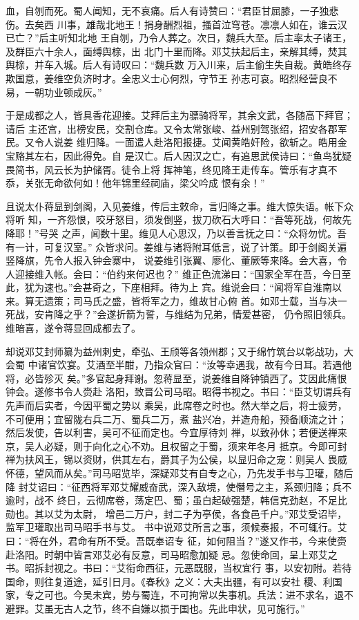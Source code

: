 血，自刎而死。蜀人闻知，无不哀痛。后人有诗赞曰：“君臣甘屈膝，一子独悲伤。去矣西
川事，雄哉北地王！捐身酬烈祖，搔首泣穹苍。凛凛人如在，谁云汉已亡？”后主听知北地
王自刎，乃令人葬之。次日，魏兵大至。后主率太子诸王，及群臣六十余人，面缚舆榇，出
北门十里而降。邓艾扶起后主，亲解其缚，焚其舆榇，并车入城。后人有诗叹曰：“魏兵数
万入川来，后主偷生失自裁。黄皓终存欺国意，姜维空负济时才。全忠义士心何烈，守节王
孙志可哀。昭烈经营良不易，一朝功业顿成灰。”

于是成都之人，皆具香花迎接。艾拜后主为骠骑将军，其余文武，各随高下拜官；请后
主还宫，出榜安民，交割仓库。又令太常张峻、益州别驾张绍，招安各郡军民。又令人说姜
维归降。一面遣人赴洛阳报捷。艾闻黄皓奸险，欲斩之。皓用金宝赂其左右，因此得免。自
是汉亡。后人因汉之亡，有追思武侯诗曰：“鱼鸟犹疑畏简书，风云长为护储胥。徒令上将
挥神笔，终见降王走传车。管乐有才真不忝，关张无命欲何如！他年锦里经祠庙，梁父吟成
恨有余！”

且说太仆蒋显到剑阁，入见姜维，传后主敕命，言归降之事。维大惊失语。帐下众将听
知，一齐怨恨，咬牙怒目，须发倒竖，拔刀砍石大呼曰：“吾等死战，何故先降耶！”号哭
之声，闻数十里。维见人心思汉，乃以善言抚之曰：“众将勿忧。吾有一计，可复汉室。”
众皆求问。姜维与诸将附耳低言，说了计策。即于剑阁关遍竖降旗，先令人报入钟会寨中，
说姜维引张翼、廖化、董厥等来降。会大喜，令人迎接维入帐。会曰：“伯约来何迟也？”
维正色流涕曰：“国家全军在吾，今日至此，犹为速也。”会甚奇之，下座相拜。待为上
宾。维说会曰：“闻将军自淮南以来。算无遗策；司马氏之盛，皆将军之力，维故甘心俯
首。如邓士载，当与决一死战，安肯降之乎？”会遂折箭为誓，与维结为兄弟，情爱甚密，
仍令照旧领兵。维暗喜，遂令蒋显回成都去了。

却说邓艾封师纂为益州刺史，牵弘、王颀等各领州郡；又于绵竹筑台以彰战功，大会蜀
中诸官饮宴。艾酒至半酣，乃指众官曰：“汝等幸遇我，故有今日耳。若遇他将，必皆殄灭
矣。”多官起身拜谢。忽蒋显至，说姜维自降钟镇西了。艾因此痛恨钟会。遂修书令人赍赴
洛阳，致晋公司马昭。昭得书视之。书曰：“臣艾切谓兵有先声而后实者，今因平蜀之势以
乘吴，此席卷之时也。然大举之后，将士疲劳，不可便用；宜留陇右兵二万、蜀兵二万，煮
盐兴冶，并造舟船，预备顺流之计；然后发使，告以利害，吴可不征而定也。今宜厚待刘
禅，以致孙休；若便送禅来京，吴人必疑，则于向化之心不劝。且权留之于蜀，须来年冬月
抵京。今即可封禅为扶风王，锡以资财，供其左右，爵其子为公侯，以显归命之宠：则吴人
畏威怀德，望风而从矣。”司马昭览毕，深疑邓艾有自专之心，乃先发手书与卫瓘，随后降
封艾诏曰：“征西将军邓艾耀威奋武，深入敌境，使僭号之主，系颈归降；兵不逾时，战不
终日，云彻席卷，荡定巴、蜀；虽白起破强楚，韩信克劲赵，不足比勋也。其以艾为太尉，
增邑二万户，封二子为亭侯，各食邑千户。”邓艾受诏毕，监军卫瓘取出司马昭手书与艾。
书中说邓艾所言之事，须候奏报，不可辄行。艾曰：“将在外，君命有所不受。吾既奉诏专
征，如何阻当？”遂又作书，今来使赍赴洛阳。时朝中皆言邓艾必有反意，司马昭愈加疑
忌。忽使命回，呈上邓艾之书。昭拆封视之。书曰：“艾衔命西征，元恶既服，当权宜行
事，以安初附。若待国命，则往复道途，延引日月。《春秋》之义：大夫出疆，有可以安社
稷、利国家，专之可也。今吴未宾，势与蜀连，不可拘常以失事机。兵法：进不求名，退不
避罪。艾虽无古人之节，终不自嫌以损于国也。先此申状，见可施行。”

